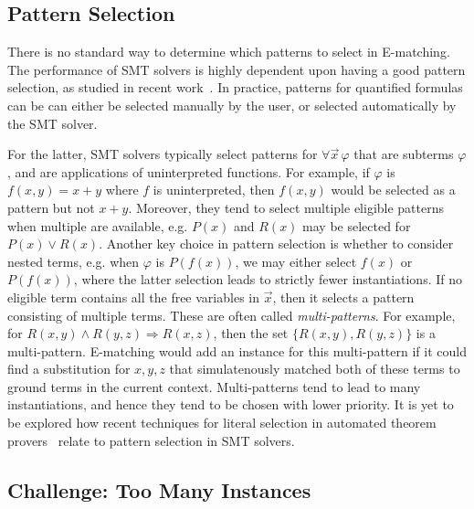 \documentclass[oribibl]{llncs}
\begin{document}
\subsection{Pattern Selection}
There is no standard way to determine which patterns to select in E-matching.
The performance of SMT solvers is highly dependent upon having a good pattern selection, as studied in recent work~\cite{DBLP:conf/cav/LeinoP16}.
In practice, patterns for quantified formulas can be can either be selected manually by the user,
or selected automatically by the SMT solver.

For the latter, SMT solvers typically select patterns for $\forall \vec x\, \varphi$ that are subterms $\varphi$,
and are applications of uninterpreted functions.
For example, if $\varphi$ is $f( x, y ) = x + y$ where $f$ is uninterpreted, then $f( x, y )$ would be selected as a pattern
but not $x + y$.
Moreover, they tend to select multiple eligible patterns when multiple are available, 
e.g. $P( x )$ and $R( x )$ may be selected for $P( x ) \vee R( x )$.
Another key choice in pattern selection is whether to consider nested terms, e.g. when $\varphi$ is $P( f( x ) )$,
we may either select $f( x )$ or $P( f( x ) )$, where the latter selection leads to strictly fewer instantiations.
If no eligible term contains all the free variables in $\vec x$, then it selects a pattern consisting of multiple terms.
These are often called \emph{multi-patterns}.
For example, for $R( x, y ) \wedge R( y, z ) \Rightarrow R( x, z )$, then the set $\{ R( x, y ), R( y, z ) \}$ is a multi-pattern.
E-matching would add an instance for this multi-pattern if it could find a substitution for $x, y, z$
that simulatenously matched both of these terms to ground terms in the current context.
Multi-patterns tend to lead to many instantiations, and hence they tend to be chosen with lower priority.
It is yet to be explored how recent techniques for literal selection in automated theorem provers~\cite{DBLP:conf/cade/HoderR0V16}
relate to pattern selection in SMT solvers.

\subsection{Challenge: Too Many Instances}
\end{document}
